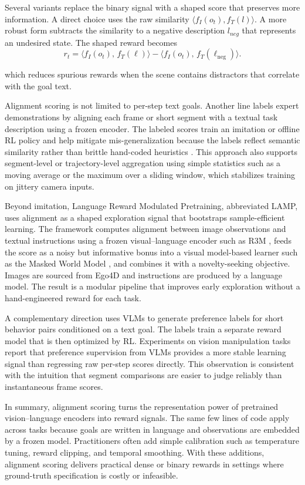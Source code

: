 \documentclass[master,english,final]{kaist-ucs}
\begin{document}
Several variants replace the binary signal with a shaped score that preserves more information. A direct choice uses the raw similarity $\langle f_I(o_t), f_T(l)\rangle$. A more robust form subtracts the similarity to a negative description $l_{neg}$ that represents an undesired state. The shaped reward becomes
$$r_t=\langle f_I(o_t),\, f_T(\ell)\rangle-\langle f_I(o_t),\, f_T(\ell_{\text{neg}})\rangle.$$

which reduces spurious rewards when the scene contains distractors that correlate with the goal text.

Alignment scoring is not limited to per-step text goals. Another line labels expert demonstrations by aligning each frame or short segment with a textual task description using a frozen encoder. The labeled scores train an imitation or offline RL policy and help mitigate mis-generalization because the labels reflect semantic similarity rather than brittle hand-coded heuristics \cite{kim2023guide}. This approach also supports segment-level or trajectory-level aggregation using simple statistics such as a moving average or the maximum over a sliding window, which stabilizes training on jittery camera inputs.

Beyond imitation, Language Reward Modulated Pretraining, abbreviated LAMP\cite{adeniji2023language}, uses alignment as a shaped exploration signal that bootstraps sample-efficient learning. The framework computes alignment between image observations and textual instructions using a frozen visual–language encoder such as R3M \cite{nair2022r3m}, feeds the score as a noisy but informative bonus into a visual model-based learner such as the Masked World Model \cite{seo2023masked}, and combines it with a novelty-seeking objective. Images are sourced from Ego4D\cite{grauman2022ego4d} and instructions are produced by a language model. The result is a modular pipeline that improves early exploration without a hand-engineered reward for each task.

A complementary direction uses VLMs to generate preference labels for short behavior pairs conditioned on a text goal\cite{wang2024rl}. The labels train a separate reward model that is then optimized by RL. Experiments on vision manipulation tasks report that preference supervision from VLMs provides a more stable learning signal than regressing raw per-step scores directly. This observation is consistent with the intuition that segment comparisons are easier to judge reliably than instantaneous frame scores.

In summary, alignment scoring turns the representation power of pretrained vision–language encoders into reward signals. The same few lines of code apply across tasks because goals are written in language and observations are embedded by a frozen model. Practitioners often add simple calibration such as temperature tuning, reward clipping, and temporal smoothing. With these additions, alignment scoring delivers practical dense or binary rewards in settings where ground-truth specification is costly or infeasible.
\end{document}
